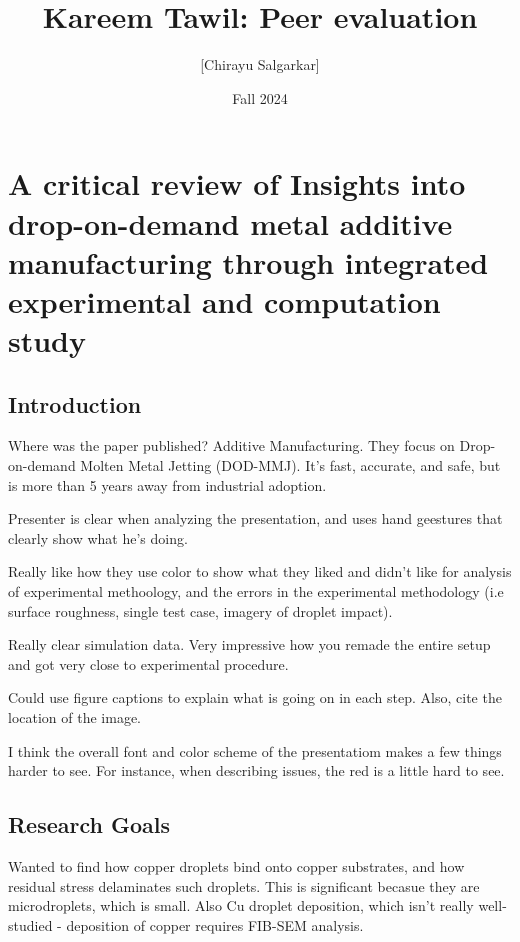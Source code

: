 \documentclass[10pt, oneside]{article}
\title{Kareem Tawil: Peer evaluation}
\author{[Chirayu Salgarkar]}
\date{Fall 2024}
\begin{document}
\maketitle
\tableofcontents

\vspace{.25in}

\section{A critical review of Insights into drop-on-demand metal additive manufacturing through integrated experimental and computation study}

\subsection{Introduction}
Where was the paper published? Additive Manufacturing. They focus on Drop-on-demand Molten Metal Jetting (DOD-MMJ). It's fast, accurate, and safe, but is more than 5 years away from industrial adoption. 

Presenter is clear when analyzing the presentation, and uses hand geestures that clearly show what he's doing.

Really like how they use color to show what they liked and didn't like for analysis of experimental methoology, and the errors in the experimental methodology (i.e surface roughness, single test case, imagery of droplet impact). 

Really clear simulation data. Very impressive how you remade the entire setup and got very close to experimental procedure. 





Could use figure captions to explain what is going on in each step. Also, cite the location of the image. 

I think the overall font and color scheme of the presentatiom makes a few things harder to see. For instance, when describing issues, the red is a little hard to see.

\subsection{Research Goals}
Wanted to find how copper droplets bind onto copper substrates, and how residual stress delaminates such droplets. This is significant becasue they are microdroplets, which is small. Also Cu droplet deposition, which isn't really well-studied - deposition of copper requires FIB-SEM analysis. 
\end{document}
